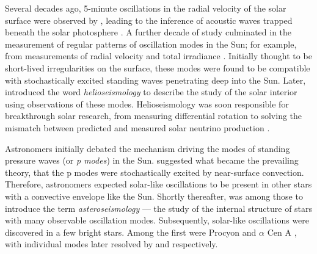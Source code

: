 Several decades ago, 5-minute oscillations in the radial velocity of the solar surface were observed by \citet{Leighton.Noyes.ea1962}, leading to the inference of acoustic waves trapped beneath the solar photosphere \citep{Ulrich1970}. A further decade of study culminated in the measurement of regular patterns of oscillation modes in the Sun; for example, from measurements of radial velocity \citep{Claverie.Isaak.ea1979} and total irradiance \citep{Woodard.Hudson1983a}. Initially thought to be short-lived irregularities on the surface, these modes were found to be compatible with stochastically excited standing waves penetrating deep into the Sun. Later, \citet{Deubner.Gough1984} introduced the word \emph{helioseismology} to describe the study of the solar interior using observations of these modes. Helioseismology was soon responsible for breakthrough solar research, from measuring differential rotation \citep{Deubner.Ulrich.ea1979} to solving the mismatch between predicted and measured solar neutrino production \citep{Bahcall.Ulrich1988}.

Astronomers initially debated the mechanism driving the modes of standing pressure waves (or \emph{p modes}) in the Sun. \citet{Goldreich.Keeley1977} suggested what became the prevailing theory, that the p modes were stochastically excited by near-surface convection. Therefore, astronomers expected solar-like oscillations to be present in other stars with a convective envelope like the Sun. Shortly thereafter, \citet{Christensen-Dalsgaard1984} was among those to introduce the term \emph{asteroseismology} --- the study of the internal structure of stars with many observable oscillation modes. Subsequently, solar-like oscillations were discovered in a few bright stars. Among the first were Procyon and \(\alpha\) Cen A \citep{Gelly.Grec.ea1986}, with individual modes later resolved by \citet{Martic.Schmitt.ea1999} and \citet{Bouchy.Carrier2001} respectively.

